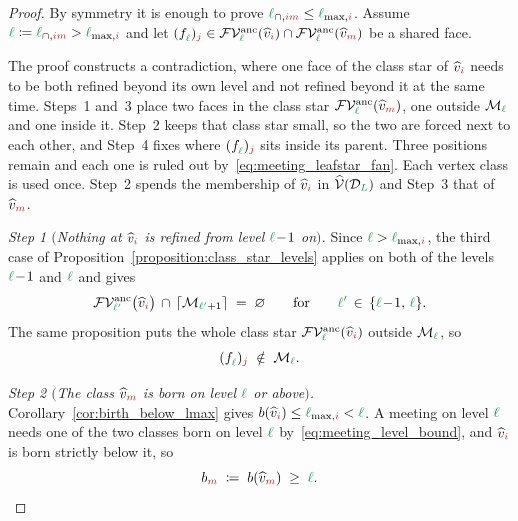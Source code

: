 \documentclass[a4paper, 12pt]{article}
\makeatletter
\newcommand{\lmaxIdx}[1]{\l_{\max,#1}}
\newcommand{\lmeetIdx}[2]{\l_{\cap,#1#2}}
\newcommand{\green}{\color{ForestGreen}}
\newcommand{\brickred}{\color{BrickRed}}
\newcommand{\V}{\mathcal{V}}
\newcommand{\F}{\mathcal{F}}
\newcommand{\vertexClass}[1]{\widehat{v}_{#1}}
\newcommand{\vertexClasses}{\widehat{\V}}
\newcommand{\face}[2]{\freeQ{f}{}{#1}{#2}}
\newcommand{\coarseIdxone}{{\brickred i}}
\newcommand{\coarseIdxtwo}{{\brickred m}}
\newcommand{\fineIdxone}{{\brickred j}}
\renewcommand{\l}{{\green\ell}}
\renewcommand{\L}{{\green L}}
\newcommand{\lone}{{\green {\l'}  }}
\newcommand{\freeQ}[4]{ ( {#1}^{#2}_{#3} )_{#4}}
\newcommand{\M}{\mathcal{M}}
\theoremstyle{definition}
\theoremstyle{plain}
\numberwithin{equation}{section}
\newcommand{\ancestorPatch}[1]{\lceil #1 \rceil}
\DeclareRobustCommand{\domseq}[1][]{\mathcal{D}\ifx\@empty#1\@empty\else_{#1}\fi}
\newcommand{\birthLevel}{b}
\newcommand{\FVanc}[1]{\F\V^{\mathrm{anc}}_{#1}}            %
\makeatother
\begin{document}
\begin{proof}
    By symmetry it is enough to prove $\lmeetIdx{\coarseIdxone}{\coarseIdxtwo} \leq \lmaxIdx{\coarseIdxone}$. Assume $\l \coloneq \lmeetIdx{\coarseIdxone}{\coarseIdxtwo} > \lmaxIdx{\coarseIdxone}$ and let $\face{\l}{\fineIdxone} \in \FVanc{\l}(\vertexClass{\coarseIdxone}) \cap \FVanc{\l}(\vertexClass{\coarseIdxtwo})$ be a shared face.

    The proof constructs a contradiction, where one face of the class star of $\vertexClass{\coarseIdxone}$ needs to be both refined beyond its own level and not refined beyond it at the same time. Steps~1 and~3 place two faces in the class star $\FVanc{\l}(\vertexClass{\coarseIdxtwo})$, one outside $\M_\l$ and one inside it. Step~2 keeps that class star small, so the two are forced next to each other, and Step~4 fixes where $\face{\l}{\fineIdxone}$ sits inside its parent. Three positions remain and each one is ruled out by~\eqref{eq:meeting_leafstar_fan}. Each vertex class is used once. Step~2 spends the membership of $\vertexClass{\coarseIdxone}$ in $\vertexClasses(\domseq[\L])$ and Step~3 that of $\vertexClass{\coarseIdxtwo}$.

    \emph{Step 1 $($Nothing at $\vertexClass{\coarseIdxone}$ is refined from level $\l \! - \! 1$ on$)$.} Since $\l > \lmaxIdx{\coarseIdxone}$, the third case of Proposition~\ref{proposition:class_star_levels} applies on both of the levels $\l \! - \! 1$ and $\l$ and gives
    \begin{equation}
        \label{eq:meeting_leafstar_fan}
        \FVanc{\lone} \big( \vertexClass{\coarseIdxone} \big) \, \cap \, \ancestorPatch{\M_{\lone+1}} \; = \; \varnothing \qquad \text{for} \qquad \lone \, \in \, \{ \l \! - \! 1, \, \l \} .
    \end{equation}
    The same proposition puts the whole class star $\FVanc{\l}(\vertexClass{\coarseIdxone})$ outside $\M_\l$, so
    \begin{equation}
        \label{eq:meeting_leafstar_step}
        \face{\l}{\fineIdxone} \; \notin \; \M_\l .
    \end{equation}

    \emph{Step 2 $($The class $\vertexClass{\coarseIdxtwo}$ is born on level $\l$ or above$)$.} Corollary~\ref{cor:birth_below_lmax} gives $\birthLevel(\vertexClass{\coarseIdxone}) \leq \lmaxIdx{\coarseIdxone} < \l$. A meeting on level $\l$ needs one of the two classes born on level $\l$ by~\eqref{eq:meeting_level_bound}, and $\vertexClass{\coarseIdxone}$ is born strictly below it, so
    \begin{equation}
        \label{eq:meeting_leafstar_birth}
        b_\coarseIdxtwo \; \coloneq \; \birthLevel(\vertexClass{\coarseIdxtwo}) \; \geq \; \l .
    \end{equation}


\end{proof}
\end{document}
